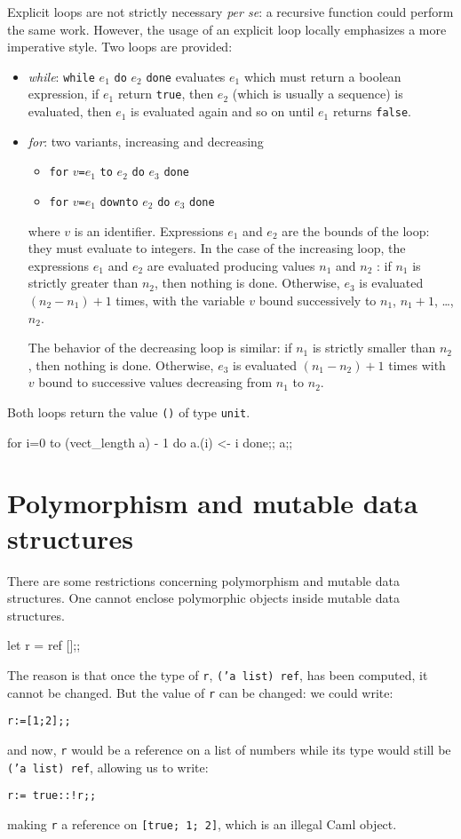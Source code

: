 Explicit loops are not strictly necessary {\em per se}: a recursive
function could perform the same work. However, the usage of an
explicit loop locally emphasizes a more imperative style. Two loops
are provided:
\begin{itemize}
\item {\it while}: {\tt while} $e_1$ {\tt do} $e_2$ {\tt done}
evaluates $e_1$ which must return a boolean expression, if $e_1$
return {\tt true}, then $e_2$ (which is usually a sequence) is
evaluated, then $e_1$ is evaluated again and so on until $e_1$
returns {\tt false}.

\item{\it for}: two variants, increasing and decreasing
\begin{itemize}
\item {\tt for} $v$\verb|=|$e_1$ {\tt to} $e_2$ {\tt do} $e_3$ {\tt done}
\item {\tt for} $v$\verb|=|$e_1$ {\tt downto} $e_2$ {\tt do} $e_3$ {\tt done}
\end{itemize}
where $v$ is an identifier. Expressions $e_1$ and $e_2$ are the bounds
of the loop: they must evaluate to integers. In the case of the
increasing loop, the expressions $e_1$ and $e_2$ are evaluated
producing values $n_1$ and $n_2$ : if $n_1$ is strictly greater than
$n_2$, then nothing is done.  Otherwise, $e_3$ is evaluated $(n_2 -
n_1)+1$ times, with the variable $v$ bound successively to $n_1$, $n_1
+1$, \ldots, $n_2$.

The behavior of the decreasing loop is similar: if $n_1$ is strictly
smaller than $n_2$, then nothing is done. Otherwise, $e_3$ is
evaluated $(n_1 - n_2)+1$ times with $v$ bound to successive values
decreasing from $n_1$ to $n_2$.
\end{itemize}
Both loops return the value \verb|()| of type {\tt unit}.
\begin{caml_example}
for i=0 to (vect_length a) - 1 do a.(i) <- i done;;
a;;
\end{caml_example}

\section{Polymorphism and mutable data structures}

There are some restrictions concerning polymorphism and mutable data
structures.
One cannot enclose polymorphic objects inside mutable data structures.
\begin{caml_example}
let r = ref [];;
\end{caml_example}
The reason is that once the type of {\tt r}, {\tt ('a list) ref}, has
been computed, it cannot be changed. But the value of {\tt r} can be
changed: we could write:
\begin{verbatim}
r:=[1;2];;
\end{verbatim}
and now, {\tt r} would be a reference on a list of numbers while its type
would still be {\tt ('a list) ref}, allowing us to write:
\begin{verbatim}
r:= true::!r;;
\end{verbatim}
making {\tt r} a reference on {\tt [true; 1; 2]}, which is an illegal
Caml object.

